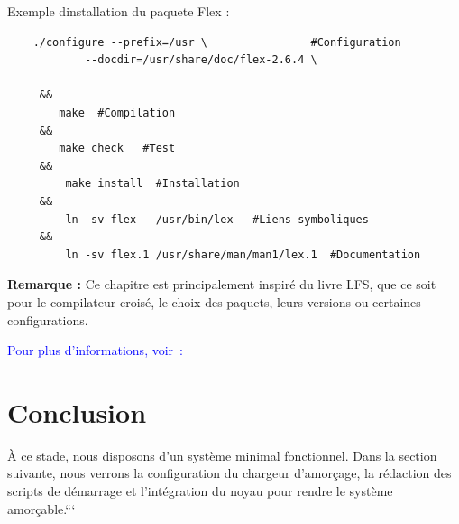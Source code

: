 

Exemple dinstallation du paquete Flex :

\begin{verbatim}
    ./configure --prefix=/usr \                #Configuration 
            --docdir=/usr/share/doc/flex-2.6.4 \
            
     && 
        make  #Compilation
     &&
        make check   #Test
     &&
         make install  #Installation
     &&
         ln -sv flex   /usr/bin/lex   #Liens symboliques
     &&
         ln -sv flex.1 /usr/share/man/man1/lex.1  #Documentation
\end{verbatim}

\textbf{Remarque :} Ce chapitre est principalement inspiré du livre LFS, que ce soit pour le compilateur croisé, le choix des paquets, leurs versions ou certaines configurations.

\textcolor{blue}{Pour plus d’informations, voir~: \cite{lfs_book}}
 
\section{Conclusion}
À ce stade, nous disposons d’un système minimal fonctionnel. Dans la section suivante, nous verrons la configuration du chargeur d’amorçage, la rédaction des scripts de démarrage et l’intégration du noyau pour rendre le système amorçable.```
\clearpage